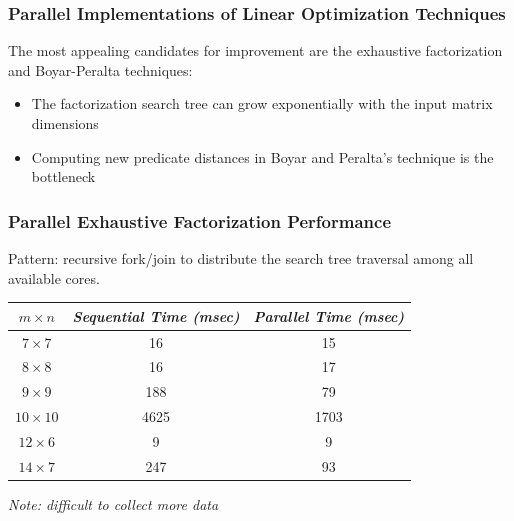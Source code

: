 \documentclass[10pt]{beamer}
\begin{document}
\begin{frame}
	\frametitle{Parallel Implementations of Linear Optimization Techniques}
	The most appealing candidates for improvement are the exhaustive factorization and Boyar-Peralta techniques:
	\begin{itemize}
		\item The factorization search tree can grow exponentially with the input matrix dimensions
		\item Computing new predicate distances in Boyar and Peralta's technique is the bottleneck
	\end{itemize}
\end{frame}

\begin{frame}
	\frametitle{Parallel Exhaustive Factorization Performance}
Pattern: recursive fork/join to distribute the search tree traversal among all available cores.
\begin{table}[h]
\begin{center}
	\begin{tabular}{| c | c | c |} \hline
	$m \times n$ & \emph{Sequential Time (msec)} & \emph{Parallel Time (msec)} \\ \hline
	$7 \times 7$ & 16 & 15 \\ 
	$8 \times 8$ & 16 & 17 \\ 
	$9 \times 9$ & 188 & 79 \\ 
	$10 \times 10$ & 4625 & 1703 \\ 
	$12 \times 6$ & 9 & 9 \\
	$14 \times 7$ & 247 & 93 \\ \hline
	\end{tabular}
\end{center}
\end{table}

\begin{center}
	\emph{Note: difficult to collect more data}
\end{center}

\end{frame}
\end{document}
